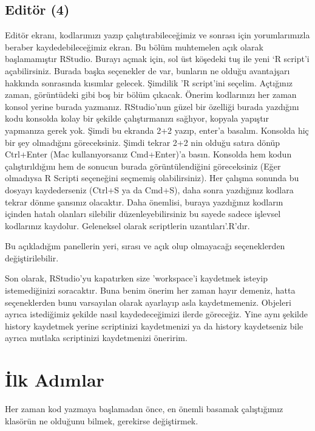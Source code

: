 \documentclass[]{book}
\begin{document}
\hypertarget{editor-4}{%
\section{Editör (4)}\label{editor-4}}

Editör ekranı, kodlarımızı yazıp çalıştırabileceğimiz ve sonrası için
yorumlarımızla beraber kaydedebileceğimiz ekran. Bu bölüm muhtemelen
açık olarak başlamamıştır RStudio. Burayı açmak için, sol üst köşedeki
tuş ile yeni `R script'i açabilirsiniz. Burada başka seçenekler de var,
bunların ne olduğu avantajşarı hakkında sonrasında kısımlar gelecek.
Şimdilik 'R script'ini seçelim. Açtığınız zaman, görüntüdeki gibi boş
bir bölüm çıkacak. Önerim kodlarınızı her zaman konsol yerine burada
yazmanız. RStudio'nun güzel bir özelliği burada yazdığını kodu konsolda
kolay bir şekilde çalıştırmanızı sağlıyor, kopyala yapıştır yapmanıza
gerek yok. Şimdi bu ekranda 2+2 yazıp, enter'a basalım. Konsolda hiç bir
şey olmadığını göreceksiniz. Şimdi tekrar 2+2 nin olduğu satıra dönüp
Ctrl+Enter (Mac kullanıyorsanız Cmd+Enter)'a basın. Konsolda hem kodun
çalıştırıldığını hem de sonucun burada görüntülendiğini göreceksiniz
(Eğer olmadıysa R Scripti seçeneğini seçmemiş olabilirsiniz). Her
çalışma sonunda bu dosyayı kaydederseniz (Ctrl+S ya da Cmd+S), daha
sonra yazdığınız kodlara tekrar dönme şansınız olacaktır. Daha önemlisi,
buraya yazdığınız kodların içinden hatalı olanları silebilir
düzenleyebilirsiniz bu sayede sadece işlevsel kodlarınız kaydolur.
Geleneksel olarak scriptlerin uzantıları'.R'dır.

Bu açıkladığım panellerin yeri, sırası ve açık olup olmayacağı
seçeneklerden değiştirilebilir.

Son olarak, RStudio'yu kapatırken size 'workspace'i kaydetmek isteyip
istemediğinizi soracaktır. Buna benim önerim her zaman hayır demeniz,
hatta seçeneklerden bunu varsayılan olarak ayarlayıp asla kaydetmemeniz.
Objeleri ayrıca istediğimiz şekilde nasıl kaydedeceğimizi ilerde
göreceğiz. Yine aynı şekilde history kaydetmek yerine scriptinizi
kaydetmenizi ya da history kaydetseniz bile ayrıca mutlaka scriptinizi
kaydetmenizi öneririm.

\hypertarget{ilkadimlar}{%
\chapter{İlk Adımlar}\label{ilkadimlar}}

Her zaman kod yazmaya başlamadan önce, en önemli basamak çalıştığımız
klasörün ne olduğunu bilmek, gerekirse değiştirmek.
\end{document}
